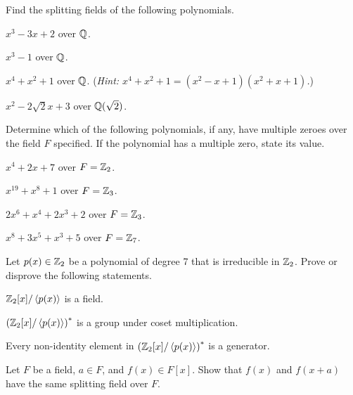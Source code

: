 \begin{problem}
    Find the splitting fields of the following polynomials.
    \begin{partquestions}{\alph*}
        \item $x^3 - 3x + 2$ over $\mathbb{Q}$.
        \item $x^3 - 1$ over $\mathbb{Q}$.
        \item $x^4 + x^2 + 1$ over $\mathbb{Q}$.\newline
        (\textit{Hint: $x^4+x^2+1 = (x^2-x+1)(x^2+x+1)$.})
        \item $x^2 - 2\sqrt{2}x + 3$ over $\mathbb{Q}(\sqrt2)$.
    \end{partquestions}
\end{problem}

\begin{problem}
    Determine which of the following polynomials, if any, have multiple zeroes over the field $F$ specified. If the polynomial has a multiple zero, state its value.
    \begin{partquestions}{\alph*}
        \item $x^4 + 2x + 7$ over $F = \mathbb{Z}_2$.
        \item $x^{19} + x^8 + 1$ over $F = \mathbb{Z}_3$.
        \item $2x^6 + x^4 + 2x^3 + 2$ over $F = \mathbb{Z}_3$.
        \item $x^8 + 3x^5 + x^3 + 5$ over $F = \mathbb{Z}_7$.
    \end{partquestions}
\end{problem}

\begin{problem}
    Let $p(x) \in \mathbb{Z}_2$ be a polynomial of degree 7 that is irreducible in $\mathbb{Z}_2$. Prove or disprove the following statements.
    \begin{partquestions}{\roman*}
        \item $\mathbb{Z}_2[x]/\left\langle p(x)\right\rangle$ is a field.
        \item $\left(\mathbb{Z}_2[x]/\left\langle p(x)\right\rangle\right)^\ast$ is a group under coset multiplication.
        \item Every non-identity element in $\left(\mathbb{Z}_2[x]/\left\langle p(x)\right\rangle\right)^\ast$ is a generator.
    \end{partquestions}
\end{problem}

\begin{problem}
    Let $F$ be a field, $a \in F$, and $f(x) \in F[x]$. Show that $f(x)$ and $f(x+a)$ have the same splitting field over $F$.
\end{problem}

